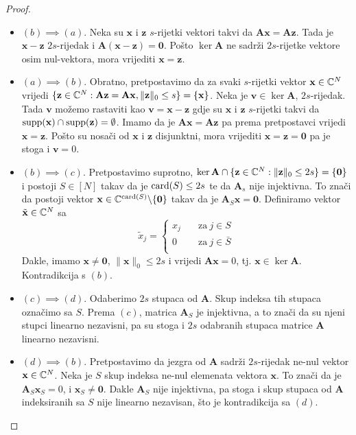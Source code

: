\documentclass[a4paper,twoside,12pt]{memoir} %
\newcommand{\vect}[1]{\mathbf{#1}}
\renewcommand{\vec}{\vect}
\newcommand{\card}{\text{\normalfont{card}}}
\newcommand{\supp}{\text{\normalfont{supp}}}
\newcommand{\norm}[1]{\|{#1}\|}
\begin{document}
\begin{proof}
    \begin{itemize}
        \item[]$(b)\implies(a)$. Neka su $\vec x$ i $\vec z$ $s$-rijetki vektori takvi da $\vec{Ax} = \vec{Az}$. Tada je $\vec x - \vec z$ $2s$-rijedak i $\vec A(\vec x - \vec z) = \vec 0$. Po\v{s}to $\ker \vec A$ ne sadr\v{z}i $2s$-rijetke vektore osim nul-vektora, mora vrijediti $\vec x = \vec z$.
        \item[] $(a)\implies(b)$. Obratno, pretpostavimo da za svaki $s$-rijetki vektor $\vec x \in \C^N$ vrijedi $\{\vec z \in \C^N : \vec{Az} = \vec{Ax}, \norm{\vec z}_0 \leq s\} = \{\vec x\}$. Neka je $\vec v \in \ker \vec A$, $2s$-rijedak. Tada $\vec v$ mo\v{z}emo rastaviti kao $\vec v = \vec x - \vec z$ gdje su $\vec x$ i $\vec z$ $s$-rijetki takvi da $\supp(\vec x)\cap \supp(\vec z) = \emptyset$. Imamo da je $\vec{Ax}=\vec{Az}$ pa prema pretpostavci vrijedi $\vec{x}=\vec{z}$. Po\v{s}to su nosa\v{c}i od $\vec x$ i $\vec z$ disjunktni, mora vrijediti $\vec x = \vec z = \vec 0$ pa je stoga i $\vec v = 0$.
        \item[] $(b)\implies(c)$. Pretpostavimo suprotno, $\ker \vec A \cap \{\vec z \in \C^N: \norm{\vec z}_0 \leq 2s\} = \{\vec 0\}$ i postoji $S \in [N]$ takav da je $\card(S) \leq 2s$ te da $\vec A_s$ nije injektivna. To zna\v{c}i da postoji vektor $\vec x \in \C^{\card(S)} \backslash \{\vec 0\}$ takav da je $\vec A_S \vec x = \vec 0$. Definiramo vektor $\tilde{\vec{x}}\in \C^N$ sa 
            \begin{equation*}
                \tilde{x}_j = 
                \begin{cases}
                    x_j \quad & \text{za}\ j \in S \\
                    0 \quad & \text{za}\  j \in \bar S \\
                \end{cases}
            \end{equation*}
            Dakle, imamo $\vec x \neq \vec 0$, $\norm{\vec x}_0 \leq 2s$ i vrijedi $\vec{Ax}=0$, tj. $\vec x \in \ker \vec A$. Kontradikcija s $(b)$.
        \item[]$(c)\implies(d)$. Odaberimo $2s$  stupaca od $\vec A$. Skup indeksa tih stupaca ozna\v{c}imo sa $S$. Prema $(c)$, matrica $\vec A_S$ je injektivna, a to zna\v{c}i da su njeni stupci linearno nezavisni, pa su stoga i $2s$ odabranih stupaca matrice $\vec A$ linearno nezavisni.
        \item[]$(d)\implies(b)$. Pretpostavimo da jezgra od $\vec A$ sadr\v{z}i $2s$-rijedak ne-nul vektor $\vec x \in \C^N$. Neka je $S$ skup indeksa ne-nul elemenata vektora $\vec x$. To zna\v{c}i da je $\vec A_S \vec x_S = 0$, i $\vec x_S \neq \vec 0$. Dakle $\vec A_S$ nije injektivna, pa stoga i skup stupaca od $\vec A$ indeksiranih sa $S$ nije linearno nezavisan, \v{s}to je kontradikcija sa $(d)$.
\end{itemize}
\end{proof}
\end{document}
